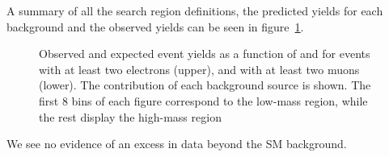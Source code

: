 A summary of all the search region definitions, the predicted yields for each background and the observed yields can be seen in figure~\ref{fig:allSRplotMuon}.
\begin{figure}[h]
\noindent
{}
\caption{Observed and expected event yields as a function of \mmin and
  \mtmin for events with
at least two electrons (upper), and with at least two muons (lower). The contribution of each
background source is shown. The first 8 bins of each figure correspond to the low-mass region,
while the rest display the high-mass region}
\label{fig:allSRplotMuon}
\end{figure}

We see no evidence of an excess in data beyond the SM background.

\clearpage
